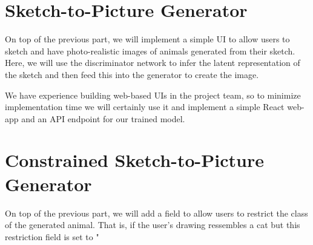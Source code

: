 \documentclass[a4paper]{article}
\begin{document}
%
%
%
\section{Sketch-to-Picture Generator}

On top of the previous part, we will implement a simple UI to allow users to sketch and have photo-realistic images of animals generated from their sketch. Here, we will use the discriminator network to infer the latent representation of the sketch and then feed this into the generator to create the image.

We have experience building web-based UIs in the project team, so to minimize implementation time we will certainly use it and implement a simple React web-app and an API endpoint for our trained model.  

%
%
%
\section{Constrained Sketch-to-Picture Generator}
On top of the previous part, we will add a field to allow users to restrict the class of the generated animal. That is, if the user's drawing ressembles a cat but this restriction field is set to "




\end{document}
